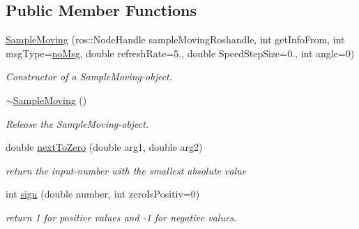 \subsection*{Public Member Functions}
\begin{DoxyCompactItemize}
\item 
\hyperlink{classSampleMoving_a3d8c3d0412d76542a2a58d7fb9995d47}{Sample\-Moving} (ros\-::\-Node\-Handle sample\-Moving\-Roshandle, int get\-Info\-From, int msg\-Type=\hyperlink{classSampleMoving_a68852e46a4c2887978990a7dd92bc66eafa273e9ac9cc895eb7a6cb70f55ff19c}{no\-Msg}, double refresh\-Rate=5., double Speed\-Step\-Size=0., int angle=0)
\begin{DoxyCompactList}\small\item\em Constructor of a Sample\-Moving-\/object. \end{DoxyCompactList}\item 
\hyperlink{classSampleMoving_ad6989eb3ac1c3647b16eae588353272b}{$\sim$\-Sample\-Moving} ()
\begin{DoxyCompactList}\small\item\em Release the Sample\-Moving-\/object. \end{DoxyCompactList}\item 
double \hyperlink{classSampleMoving_a40aff4fa58009d08161ce9720c0ea4ef}{next\-To\-Zero} (double arg1, double arg2)
\begin{DoxyCompactList}\small\item\em return the input-\/number with the smallest absolute value \end{DoxyCompactList}\item 
int \hyperlink{classSampleMoving_a0b5fbcfe6d0bf2d3de142758089f560b}{sign} (double number, int zero\-Is\-Positiv=0)
\begin{DoxyCompactList}\small\item\em return 1 for positive values and -\/1 for negative values. \end{DoxyCompactList}\end{DoxyCompactItemize}
